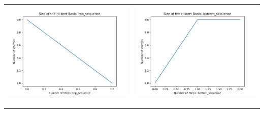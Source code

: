 \documentclass[10pt]{article}
\begin{document}
\begin{tabular}{c|c}
\begin{minipage}{.4\textwidth}
\includegraphics[width=\textwidth]{"DATA/5d/6 generators 1 bound F/top_sequence SIZE"}
\end{minipage} &
\begin{minipage}{.4\textwidth}
\includegraphics[width=\textwidth]{"DATA/5d/6 generators 1 bound F bottomup/bottom_sequence SIZE"}
\end{minipage} \\ \\
\hline \\\begin{minipage}{.4\textwidth}

\end{minipage}
\end{tabular}
\end{document}
